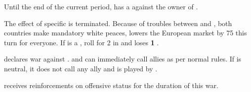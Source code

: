 \effetlong
\aparag Until the end of the current period, \FRA has a \CB against the owner
of \provinceLombardia.





\phevnt
\aparag The effect of specific  is
terminated.
\aparag Because of troubles between \paysDanemark and \paysSuede, both
countries make mandatory white peaces, lowers the European market by 75\ducats
this turn for everyone.
\aparag If \SUE is a \MAJ, roll for 2 \REVOLT in \SUE and \SUE loses {\bf 1}
\STAB.






\phevnt
\aparag \paysperse declares war against \TUR.
\aparag \paysperse and \TUR can immediately call allies as per normal rules.
\aparag If \paysperse is neutral, it does not call any ally and is played by
\SPA.

\phadm
\aparag \paysperse receives reinforcements on offensive status for the
duration of this war.











